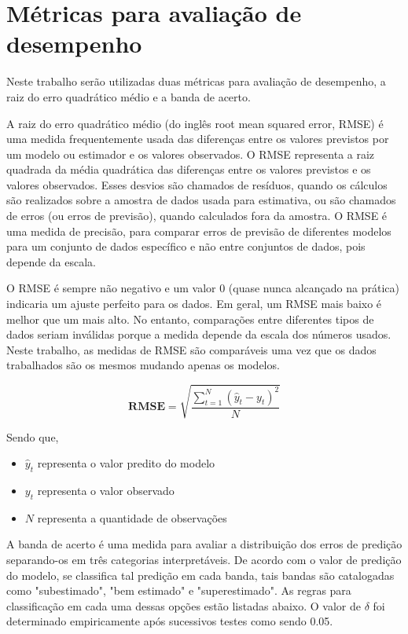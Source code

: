 \section{Métricas para avaliação de desempenho}
\label{sec:metricas_avaliacao}

Neste trabalho serão utilizadas duas métricas para avaliação de desempenho, a raiz do erro quadrático médio e a banda de acerto.

A raiz do erro quadrático médio (do inglês root mean squared error, RMSE) é uma medida frequentemente usada das diferenças entre os valores previstos por um modelo ou estimador e os valores observados. O RMSE representa a raiz quadrada da média quadrática das diferenças entre os valores previstos e os valores observados. Esses desvios são chamados de resíduos, quando os cálculos são realizados sobre a amostra de dados usada para estimativa, ou são chamados de erros (ou erros de previsão), quando calculados fora da amostra. O RMSE é uma medida de precisão, para comparar erros de previsão de diferentes modelos para um conjunto de dados específico e não entre conjuntos de dados, pois depende da escala.

O RMSE é sempre não negativo e um valor 0 (quase nunca alcançado na prática) indicaria um ajuste perfeito para os dados. Em geral, um RMSE mais baixo é melhor que um mais alto. No entanto, comparações entre diferentes tipos de dados seriam inválidas porque a medida depende da escala dos números usados. Neste trabalho, as medidas de RMSE são comparáveis uma vez que os dados trabalhados são os mesmos mudando apenas os modelos.

\begin{equation}
\mathbf {RMSE} ={\sqrt {\frac {\sum _{t=1}^{N}({\hat {y}}_{t}-y_{t})^{2}}{N}}}
\end{equation}

Sendo que,

\begin{itemize}
    \item $ \hat y_t $ representa o valor predito do modelo
    \item $ y_t $ representa o valor observado
    \item $ N $ representa a quantidade de observações
\end{itemize}

A banda de acerto é uma medida para avaliar a distribuição dos erros de predição separando-os em três categorias interpretáveis. De acordo com o valor de predição do modelo, se classifica tal predição em cada banda, tais bandas são catalogadas como "subestimado", "bem estimado" e "superestimado". As regras para classificação em cada uma dessas opções estão listadas abaixo. O valor de $ \delta $ foi determinado empiricamente após sucessivos testes como sendo 0.05.

